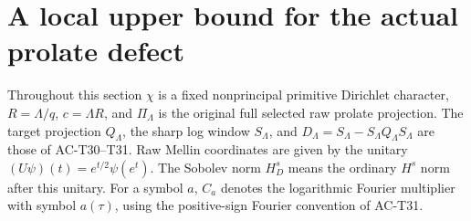 \section{A local upper bound for the actual prolate defect}

Throughout this section \(\chi\) is a fixed nonprincipal primitive
Dirichlet character, \(R=\Lambda/q\), \(c=\Lambda R\), and
\(\Pi_\Lambda\) is the original full selected raw prolate projection.
The target projection \(Q_\Lambda\), the sharp log window \(S_\Lambda\),
and \(D_\Lambda=S_\Lambda-S_\Lambda Q_\Lambda S_\Lambda\)
are those of AC-T30--T31.
Raw Mellin coordinates are given by the unitary
\((U\psi)(t)=e^{t/2}\psi(e^t)\).
The Sobolev norm \(H_D^s\) means the ordinary \(H^s\) norm
after this unitary.  For a symbol \(a\), \(C_a\) denotes the
logarithmic Fourier multiplier with symbol \(a(\tau)\), using
the positive-sign Fourier convention of AC-T31.

